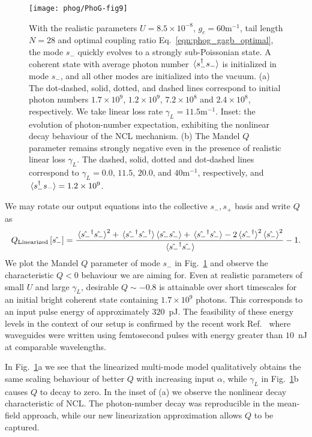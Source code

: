 \begin{figure}[htp]
\centering
\texttt{[image: phog/PhoG-fig9]}
\caption{\label{fig:phog_multimode_linearized} With the realistic parameters $U = 8.5 \times 10^{-8}$, $g_c = 60$m$^{-1}$, tail length $N = 28$ and optimal coupling ratio Eq.~\ref{eqn:phog_gagb_optimal}, the mode $s_-$ quickly evolves to a strongly sub-Poissonian state. A coherent state with average photon number $\ev*{s_-^\dagger s_-}$ is initialized in mode $s_-$, and all other modes are initialized into the vacuum. (a) The dot-dashed, solid, dotted, and dashed lines correspond to initial photon numbers $1.7\times 10^9$, $1.2\times 10^9$, $7.2\times 10^8$ and $2.4\times 10^8$, respectively. We take linear loss rate $\gamma_L = 11.5$m$^{-1}$. Inset: the evolution of photon-number expectation, exhibiting the nonlinear decay behaviour of the NCL mechanism. (b) The Mandel $Q$ parameter remains strongly negative even in the presence of realistic linear loss $\gamma_L$. The dashed, solid, dotted and dot-dashed lines correspond to $\gamma_L = 0.0$, $11.5$, $20.0$, and $40$m$^{-1}$, respectively, and $\ev*{s_-^\dagger s_-} = 1.2\times 10^9$.}
\end{figure}


We may rotate our output equations into the collective $s_-, s_+$ basis and write $Q$ as 
\begin{equation}
Q_{\text{Linearized}}\left[\hat{s_-}\right] = \frac{\ev*{\hat{s_-}^\dagger \hat{s_-}}^2 + \ev*{\hat{s_-}^\dagger\hat{s_-}^\dagger} \ev{\hat{s_-}\hat{s_-}} + \ev*{\hat{s_-}^\dagger \hat{s_-}} - 2 \ev*{\hat{s_-}^\dagger}^2 \ev{\hat{s_-}}^2}{\ev*{\hat{s_-}^\dagger \hat{s_-}}} - 1.
\end{equation}
We plot the Mandel $Q$ parameter of mode $s_-$ in Fig.~\ref{fig:phog_multimode_linearized} and observe the characteristic $Q<0$ behaviour we are aiming for. Even at realistic parameters of small $U$ and large $\gamma_L$, desirable $Q \sim -0.8$ is attainable over short timescales for an initial bright coherent state containing $1.7\times 10^9$ photons. This corresponds to an input pulse energy of approximately $320$~pJ. The feasibility of these energy levels in the context of our setup is confirmed by the recent work Ref.~\cite{Butcher2018} where waveguides were written using femtosecond pulses with energy greater than $10$~nJ at comparable wavelengths.

In Fig.~\ref{fig:phog_multimode_linearized}a we see that the linearized multi-mode model qualitatively obtains the same scaling behaviour of better $Q$ with increasing input $\alpha$, while $\gamma_L$ in Fig.~\ref{fig:phog_multimode_linearized}b causes $Q$ to decay to zero. In the inset of (a) we observe the nonlinear decay characteristic of NCL. The photon-number decay was reproducible in the mean-field approach, while our new linearization approximation allows $Q$ to be captured.



